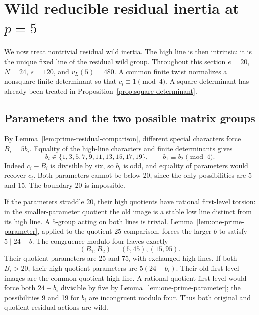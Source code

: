 \section{Wild reducible residual inertia at $p=5$}\label{sec:wild-reducible}
We now treat nontrivial residual wild inertia. The high line is then intrinsic: it is the unique fixed line of the residual wild group. Throughout this section $e=20$, $N=24$, $s=120$, and $v_L(5)=480$. A common finite twist normalizes a nonsquare finite determinant so that $c_i\equiv1\pmod4$. A square determinant has already been treated in Proposition~\ref{prop:square-determinant}.

\subsection{Parameters and the two possible matrix groups}
By Lemma~\ref{lem:prime-residual-comparison}, different special characters force $B_i=5b_i$. Equality of the high-line characters and finite determinants gives
\[
 b_i\in\{1,3,5,7,9,11,13,15,17,19\},\qquad
 b_1\equiv b_2\pmod4.
\]
Indeed $c_i-B_i$ is divisible by six, so $b_i$ is odd, and equality of parameters would recover $c_i$. Both parameters cannot be below 20, since the only possibilities are 5 and 15. The boundary 20 is impossible.

If the parameters straddle 20, their high quotients have rational first-level torsion: in the smaller-parameter quotient the old image is a stable low line distinct from its high line. A $5$-group acting on both lines is trivial. Lemma~\ref{lem:one-prime-parameter}, applied to the quotient $25$-comparison, forces the larger $b$ to satisfy $5\mid24-b$. The congruence modulo four leaves exactly
\begin{equation}\label{eq:crossing-pairs}
                         (B_1,B_2)=(5,45),(15,95).
\end{equation}
Their quotient parameters are 25 and 75, with exchanged high lines. If both $B_i>20$, their high quotient parameters are $5(24-b_i)$. Their old first-level images are the common quotient high line. A rational quotient first level would force both $24-b_i$ divisible by five by Lemma~\ref{lem:one-prime-parameter}; the possibilities 9 and 19 for $b_i$ are incongruent modulo four. Thus both original and quotient residual actions are wild.

